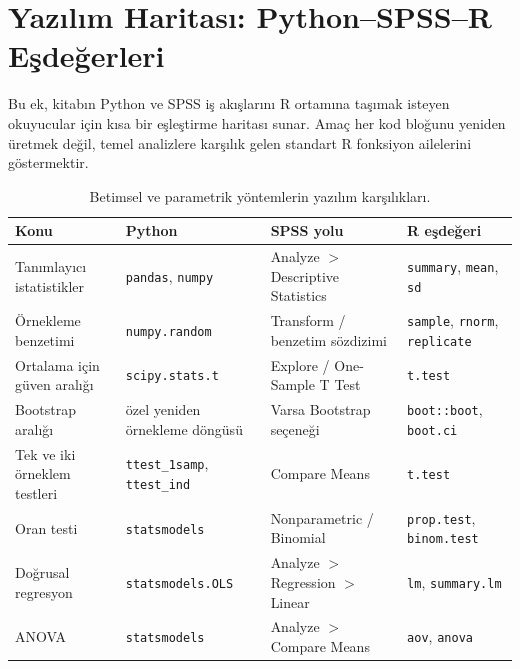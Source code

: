 \chapter{Yazılım Haritası: Python--SPSS--R Eşdeğerleri}

Bu ek, kitabın Python ve SPSS iş akışlarını R ortamına taşımak isteyen okuyucular için kısa bir eşleştirme haritası sunar. Amaç her kod bloğunu yeniden üretmek değil, temel analizlere karşılık gelen standart R fonksiyon ailelerini göstermektir.

\begin{table}[htbp]
\centering
\caption{Betimsel ve parametrik yöntemlerin yazılım karşılıkları.}
\begingroup\scriptsize
\begin{tabular}{@{}p{}p{}p{}p{}@{}}
\toprule
\textbf{Konu} & \textbf{Python} & \textbf{SPSS yolu} & \textbf{R eşdeğeri} \\
\midrule
Tanımlayıcı istatistikler & \texttt{pandas}, \texttt{numpy} & Analyze $>$ Descriptive Statistics & \texttt{summary}, \texttt{mean}, \texttt{sd} \\
Örnekleme benzetimi & \texttt{numpy.random} & Transform / benzetim sözdizimi & \texttt{sample}, \texttt{rnorm}, \texttt{replicate} \\
Ortalama için güven aralığı & \texttt{scipy.stats.t} & Explore / One-Sample T Test & \texttt{t.test} \\
Bootstrap aralığı & özel yeniden örnekleme döngüsü & Varsa Bootstrap seçeneği & \texttt{boot::boot}, \texttt{boot.ci} \\
Tek ve iki örneklem testleri & \texttt{ttest\_1samp}, \texttt{ttest\_ind} & Compare Means & \texttt{t.test} \\
Oran testi & \texttt{statsmodels} & Nonparametric / Binomial & \texttt{prop.test}, \texttt{binom.test} \\
Doğrusal regresyon & \texttt{statsmodels.OLS} & Analyze $>$ Regression $>$ Linear & \texttt{lm}, \texttt{summary.lm} \\
ANOVA & \texttt{statsmodels} & Analyze $>$ Compare Means & \texttt{aov}, \texttt{anova} \\
\bottomrule
\end{tabular}
\endgroup
\end{table}

